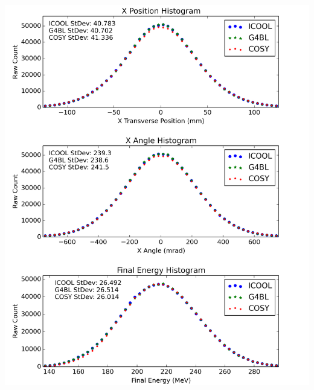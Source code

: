 \documentclass[portrait,a0paper,fontscale=0.285]{baposter} %
\begin{document}
\begin{poster}
{\begin{center}
\includegraphics[width=\textwidth]{Figures/MICE_LH}
\end{center}

}
\end{poster}
\end{document}
